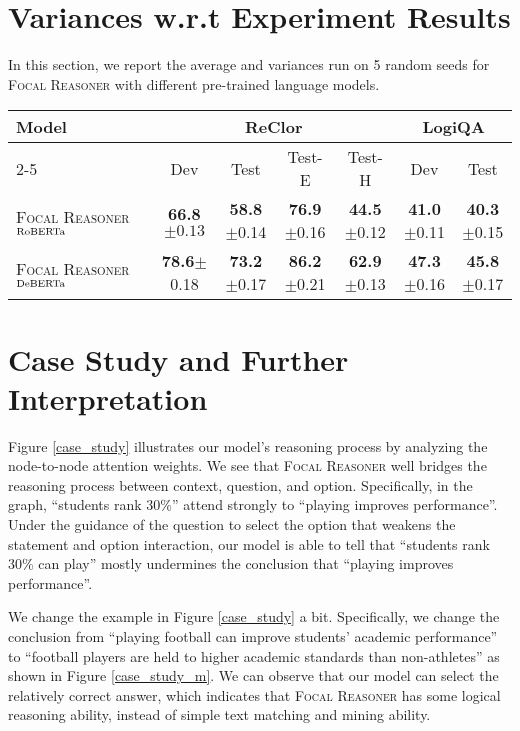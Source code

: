\documentclass[11pt]{article}
\begin{document}
\section{Variances w.r.t Experiment Results} \label{variances}
In this section, we report the average and variances run on 5 random seeds for \textsc{Focal Reasoner} with different pre-trained language models.

\begin{table*}[htb]

\setlength{\belowcaptionskip}{5pt}
\caption{Experimental results for \textsc{Focal Reasoner} with average results and variances run no 5 random seeds.}
\centering\centering\setlength{\tabcolsep}{3.0pt}
\vskip 0.1in
\begin{tabular}{lcccccc}
\toprule
\multirow{2}{*}{Model} &
\multicolumn{4}{c}{ReClor} & \multicolumn{2}{c}{LogiQA}\\
\cmidrule{2-5}
\cmidrule{6-7}
 & Dev & Test & Test-E & Test-H & Dev & Test \\ 
\midrule
\textsc{Focal Reasoner}$_{\textup{RoBERTa}}$&\textbf{66.8}$\pm 0.13$ & \textbf{58.8}$\pm$0.14&\textbf{76.9}$\pm$0.16&\textbf{44.5}$\pm$0.12 & \textbf{41.0}$\pm$0.11&\textbf{40.3}$\pm$0.15\\
\textsc{Focal Reasoner}$_{\textup{DeBERTa}}$&\textbf{78.6}$\pm$0.18 & \textbf{73.2}$\pm$0.17&\textbf{86.2}$\pm$0.21&\textbf{62.9}$\pm$0.13 & \textbf{47.3}$\pm$0.16&\textbf{45.8}$\pm$0.17\\


\bottomrule
\end{tabular}

\end{table*}

\section{Case Study and Further Interpretation} \label{interpretation}
Figure \ref{case_study} illustrates our model's reasoning process by analyzing the node-to-node attention weights. We see that \textsc{Focal Reasoner} well bridges the reasoning process between context, question, and option. Specifically, in the graph, ``students rank 30\%'' attend strongly to ``playing improves performance''. Under the guidance of the question to select the option that weakens the statement and option interaction, our model is able to tell that ``students rank 30\% can play'' mostly undermines the conclusion that ``playing improves performance''.

We change the example in Figure \ref{case_study} a bit. Specifically, we change the conclusion from ``playing football can improve students' academic performance'' to ``football players are held to higher academic standards than non-athletes'' as shown in Figure \ref{case_study_m}. We can observe that our model can select the relatively correct answer, which indicates that \textsc{Focal Reasoner} has some logical reasoning ability, instead of simple text matching and mining ability.
\end{document}
